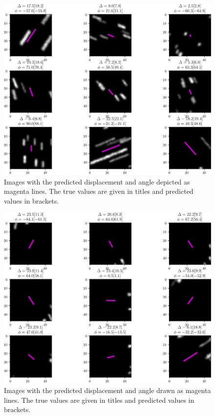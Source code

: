 \documentclass{svjour3}                     %
\begin{document}
\begin{figure}
\includegraphics[width=\textwidth]{figs/figure3.png}
\caption{Images with the predicted displacement and angle depicted as magenta lines. The true values are given in titles and predicted values in brackets.}
\label{fig:fig4}
\end{figure}

\begin{figure}
\includegraphics[width=\textwidth]{figs/figure4.png}
\caption{Images with the predicted displacement and angle drawn as magenta lines. The true values are given in titles and predicted values in brackets.}
\label{fig:fig5}
\end{figure}
\end{document}
